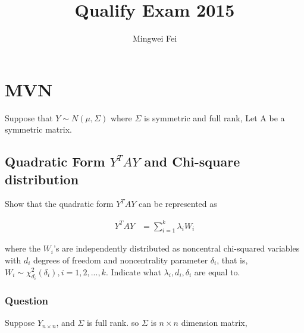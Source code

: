 \documentclass[11pt]{article} %
\title{Qualify Exam 2015}
\author{Mingwei Fei}
\begin{document}
	
	\maketitle
	
\section{MVN}
	Suppose that $Y \sim N(\mu, \Sigma)$ where $\Sigma$ is symmetric and full rank,  Let A be a symmetric matrix.
	
\subsection{Quadratic Form $Y^T A Y$ and Chi-square distribution}
	Show that the quadratic form $Y^T A Y$ can be represented as

	\begin{align*}
		Y^T A Y &= \sum_{i=1}^k \lambda_i W_i
	\end{align*}	

	where the $W_i$’s are independently distributed as noncentral chi-squared variables	with $d_i$ degrees of freedom and noncentrality parameter $\delta_i$, that is, $W_i \sim \chi^2_	{d_i}(\delta_i), i =1, 2, ..., k$. Indicate what $\lambda_i, d_i, \delta_i$ are equal to.
	
\subsubsection{Question}
Suppose $Y_{n \times n}$, and $\Sigma$ is full rank. so $\Sigma$ is $n \times n$ dimension matrix, 
\end{document}
